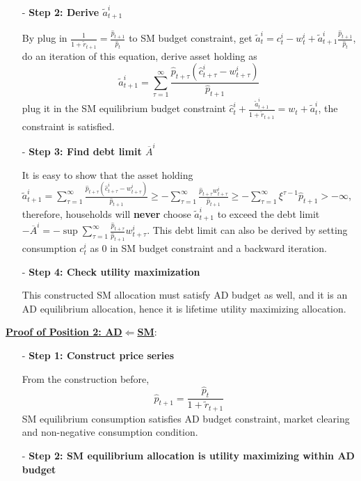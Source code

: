 \documentclass[10pt,landscape,a4paper]{article}
\let\bar\overline
\begin{document}
\begin{multicols*}{3}
\begin{itemize}
    \item[-] \textbf{Step 2: Derive $\tilde{a}^i_{t+1}$}
    
    By plug in $\frac{1}{1+\tilde{r}_{t+1}}=\frac{\hat{p}_{t+1}}{\hat{p}_t}$ to SM budget constraint, get $\tilde{a}_t^i=c_t^i-w_t^i+\tilde{a}_{t+1}^i\frac{\hat{p}_{t+1}}{\hat{p}_t}$, do an iteration of this equation, derive asset holding as $$\tilde{a}^i_{t+1}=\sum^{\infty}_{\tau=1}\frac{\hat{p}_{t+\tau}\left(\hat{c}^i_{t+\tau}-w^i_{t+\tau}\right)}{\hat{p}_{t+1}}$$
    plug it in the SM equilibrium budget constraint $\hat{c}^i_t+\frac{\tilde{a}_{t+1}^i}{1+\tilde{r}_{t+1}}=w_t+\tilde{a}_t^i$, the constraint is satisfied.
    
    \item[-] \textbf{Step 3: Find debt limit $\bar{A}^i$}
    
    It is easy to show that the asset holding $\tilde{a}^i_{t+1}=\sum^{\infty}_{\tau=1}\frac{\hat{p}_{t+\tau}\left(\hat{c}^i_{t+\tau}-w^i_{t+\tau}\right)}{\hat{p}_{t+1}}\geq -\sum^{\infty}_{\tau=1}\frac{\hat{p}_{t+\tau}w^i_{t+\tau}}{\hat{p}_{t+1}}\geq -\sum^{\infty}_{\tau=1}\xi^{\tau-1}{\hat{p}_{t+1}}>-\infty$, therefore, households will \textbf{never} choose $\tilde{a}^i_{t+1}$ to exceed the debt limit $-\bar{A}^i=-\sup \sum^{\infty}_{\tau=1}\frac{\hat{p}_{t+\tau}}{\hat{p}_{t+1}}w^i_{t+\tau}$. This debt limit can also be derived by setting consumption $c^i_t$ as 0 in SM budget constraint and a backward iteration.
    
    \item[-] \textbf{Step 4: Check utility maximization}
    
    This constructed SM allocation must satisfy AD budget as well, and it is an AD equilibrium allocation, hence it is lifetime utility maximizing allocation.

\end{itemize}
   
\vspace{2pt}
\underline{\color{myblue}\textbf{Proof of Position 2: AD$\Leftarrow$SM}}:
\begin{itemize}
    \item[-] \textbf{Step 1: Construct price series}
    
    From the construction before, $$\hat{p}_{t+1}=\frac{\hat{p}_t}{1+\tilde{r}_{t+1}}$$
    SM equilibrium consumption satisfies AD budget constraint, market clearing and non-negative consumption condition.
    
    \item[-] \textbf{Step 2: SM equilibrium allocation is utility maximizing within AD budget}
    

\end{itemize}
\end{multicols*}
\end{document}
